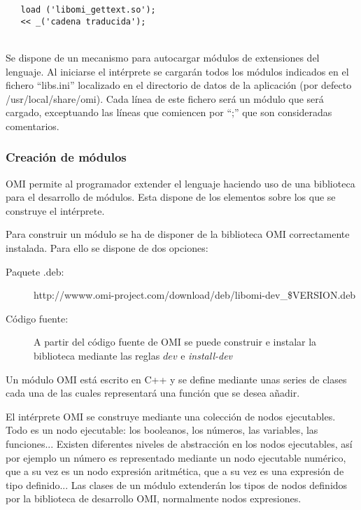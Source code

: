 \begin{lstlisting}  
   load ('libomi_gettext.so');
   << _('cadena traducida');
\end{lstlisting}
\hfill\\ 

Se dispone de un mecanismo para autocargar módulos de extensiones del lenguaje. Al iniciarse 
el intérprete se cargarán todos los módulos indicados en el fichero ``libs.ini'' localizado 
en el directorio de datos de la aplicación (por defecto /usr/local/share/omi). Cada línea 
de este fichero será un módulo que será cargado, exceptuando las líneas que comiencen por ``;'' que
son consideradas comentarios.

\subsubsection{Creación de módulos}
OMI permite al programador extender el lenguaje haciendo uso de una biblioteca para el desarrollo de módulos. Esta
dispone de los elementos sobre los que se construye el intérprete. 

Para construir un módulo se ha de disponer de la biblioteca OMI correctamente instalada. Para ello se
dispone de dos opciones:

\begin{description}
\item[Paquete .deb:] http://wwww.omi-project.com/download/deb/libomi-dev\_\$VERSION.deb
\item[Código fuente:] A partir del código fuente de OMI se puede construir e instalar la biblioteca 
mediante las reglas $dev$ e \emph{install-dev}
\end{description}

Un módulo OMI está escrito en C++ y se define mediante unas series de clases cada una de las cuales representará una
función que se desea añadir. 

El intérprete OMI se construye mediante una colección de nodos ejecutables. Todo es un nodo ejecutable: los booleanos,
los números, las variables, las funciones... Existen diferentes niveles de abstracción en los nodos ejecutables, así por ejemplo
un número es representado mediante un nodo ejecutable numérico, que a su vez es un nodo expresión aritmética, que a su vez es
una expresión de tipo definido... Las clases de un módulo extenderán los tipos de nodos definidos por la biblioteca de desarrollo OMI, 
normalmente nodos expresiones.


